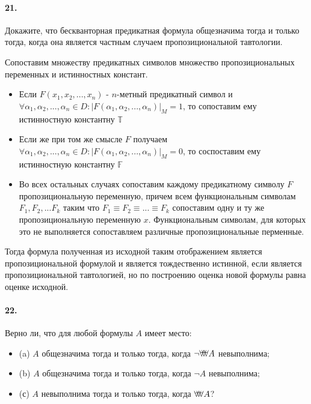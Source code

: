 \documentclass[a4paper,12pt]{article}
\begin{document}
\paragraph{21.} Докажите, что бескванторная предикатная формула общезначима тогда и только тогда, когда она является частным случаем пропозициональной тавтологии.

\begin{Solution}
Сопоставим множеству предикатных символов множество пропозициональных переменных и истинностных констант.

\begin{itemize}
\item Если $F\left(x_1, x_2, ..., x_n\right)$ - $n$-метный предикатный символ и $\forall \alpha_1, \alpha_2, ..., \alpha_n \in D : \left|F\left(\alpha_1, \alpha_2, ..., \alpha_n\right)\right|_M = 1$, то сопоставим ему истинностную константну $\mathbb{T}$

\item Если же при том же смысле $F$ получаем $\forall \alpha_1, \alpha_2, ..., \alpha_n \in D : \left|F\left(\alpha_1, \alpha_2, ...,\alpha_n\right)\right|_M = 0$, то соспоставим ему истинностную константну $\mathbb{F}$

\item Во всех остальных случаях сопоставим каждому предикатному символу $F$ пропозициональную переменную, причем всем функциональным символам $F_1, F_2, ... F_k$ таким что $F_1 \equiv F_2 \equiv ... \equiv F_k$ сопоставим одну и ту же пропозициональную переменную $x$. Функциональным символам, для которых это не выполняется сопоставляем различные пропозициональные перменные.
\end{itemize}

Тогда формула полученная из исходной таким отображением является пропозициональной формулой и является тождественно истинной, если является пропозициональной тавтологией, но по построению оценка новой формулы равна оценке исходной.
\end{Solution}

\paragraph{22.} Верно ли, что для любой формулы $A$ имеет место:
\begin{itemize}
\item (a) $A$ общезначима тогда и только тогда, когда $\neg \forall\negthickspace\forall\negthickspace\forall A$ невыполнима;

\item (b) $A$ общезначима тогда и только тогда, когда $\neg A$ невыполнима;

\item (с) $A$ невыполнима тогда и только тогда, когда $\forall\negthickspace\forall\negthickspace\forall A$?
\end{itemize} 
\end{document}
